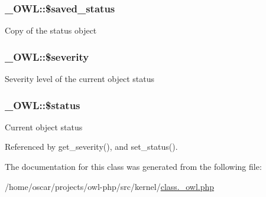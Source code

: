 \subsubsection[{\$saved\_\-status}]{\setlength{\rightskip}{0pt plus 5cm}\_\-OWL::\$saved\_\-status}\label{class__OWL_a3fd6a7b2389b745c00a419dfb8cd7724}
Copy of the status object 
\subsubsection[{\$severity}]{\setlength{\rightskip}{0pt plus 5cm}\_\-OWL::\$severity}\label{class__OWL_ad26b40a9dbbacb33e299b17826f8327c}
Severity level of the current object status 
\subsubsection[{\$status}]{\setlength{\rightskip}{0pt plus 5cm}\_\-OWL::\$status}\label{class__OWL_aaf448f6bc8a90e20c09e9e2b8fe46eb5}
Current object status 

Referenced by get\_\-severity(), and set\_\-status().



The documentation for this class was generated from the following file:\begin{DoxyCompactItemize}
\item 
/home/oscar/projects/owl-\/php/src/kernel/\hyperlink{class_8__owl_8php}{class.\_\-owl.php}\end{DoxyCompactItemize}
